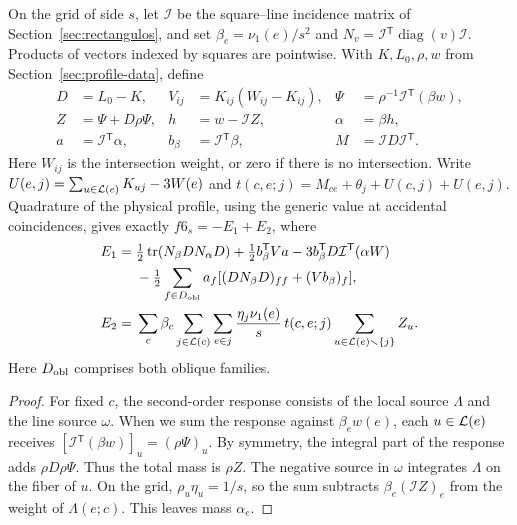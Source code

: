 \begin{lema}\label{lem:f6} On the grid of side \(s\), let
\(\mathcal I{}\) be the square--line incidence matrix of Section~\ref{sec:rectangulos}, and set
\(\beta_e=\nu_1(e)/s^2\) and \(N_v=\mathcal I{}^{\mathsf T}\operatorname{diag}(v)\mathcal I{}\). Products
of vectors indexed by squares are pointwise. With \(K,L_0,\rho,w\) from Section~\ref{sec:profile-data},
define \begin{align*}
 D&=L_0-K,& V_{ij}&=K_{ij}(W_{ij}-K_{ij}),&
 \Psi&=\rho^{-1}\mathcal I{}^{\mathsf T}(\beta w),\\
 Z&=\Psi+D\rho\Psi,& h&=w-\mathcal I{}Z,& \alpha&=\beta h,\\
 a&=\mathcal I{}^{\mathsf T}\alpha,& b_\beta&=\mathcal I{}^{\mathsf T}\beta,&
 M&=\mathcal I{}D\mathcal I{}^{\mathsf T}.
\end{align*} Here \(W_{ij}\) is the intersection weight, or zero if there is no intersection. Write
\(U(e,j)=\sum_{u\in \mathcal L(e)} K_{uj}-3W(e)\) and \(t(c,e;j)=M_{ce}+\theta_j+U(c,j)+U(e,j)\).
Quadrature of the physical profile, using the generic value at accidental coincidences, gives exactly
\(f6_s=-E_1+E_2\), where \begin{align*}
 E_1={}&\tfrac12\operatorname{tr}(N_\beta D N_\alpha D)
       +\tfrac12 b_\beta^{\mathsf T}Va-3b_\beta^{\mathsf T}D\mathcal I{}^{\mathsf T}(\alpha W)\\
     &-\tfrac12\sum_{f\in D_{\rm obl}}a_f
         [(D N_\beta D)_{ff}+(Vb_\beta)_f],\\
 E_2={}&\sum_c\beta_c\sum_{j\in \mathcal L(c)}\sum_{e\in j}
     \frac{\eta_j\nu_1(e)}s\,t(c,e;j)
     \sum_{u\in \mathcal L(e)\smallsetminus\{j\}}Z_u .
\end{align*} Here \(D_{\rm obl}\) comprises both oblique families. \end{lema} \begin{proof} For fixed
\(c\), the second-order response consists of the local source \(\Lambda\) and the line source \(\omega\).
When we sum the response against \(\beta_e w(e)\), each \(u\in \mathcal L(e)\) receives \([\mathcal
I{}^{\mathsf T}(\beta w)]_u=(\rho\Psi)_u\). By symmetry, the integral part of the response adds \(\rho
D\rho\Psi\). Thus the total mass is \(\rho Z\). The negative source in \(\omega\) integrates \(\Lambda\)
on the fiber of \(u\). On the grid, \(\rho_u\eta_u=1/s\), so the sum subtracts \(\beta_e(\mathcal
I{}Z)_e\) from the weight of \(\Lambda(e;c)\). This leaves mass \(\alpha_e\).


\end{proof}
